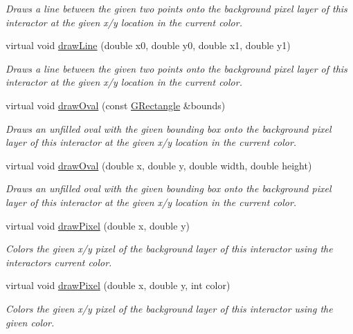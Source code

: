 \begin{DoxyCompactItemize}
\begin{DoxyCompactList}\small\item\em Draws a line between the given two points onto the background pixel layer of this interactor at the given x/y location in the current color. \end{DoxyCompactList}\item 
virtual void \mbox{\hyperlink{classsgl_1_1GDrawingSurface_aff299fe83178d2f3ce8c08c06b583484}{draw\+Line}} (double x0, double y0, double x1, double y1)
\begin{DoxyCompactList}\small\item\em Draws a line between the given two points onto the background pixel layer of this interactor at the given x/y location in the current color. \end{DoxyCompactList}\item 
virtual void \mbox{\hyperlink{classsgl_1_1GDrawingSurface_a8adc13027efe311b4a6a715205b8bc46}{draw\+Oval}} (const \mbox{\hyperlink{structsgl_1_1GRectangle}{G\+Rectangle}} \&bounds)
\begin{DoxyCompactList}\small\item\em Draws an unfilled oval with the given bounding box onto the background pixel layer of this interactor at the given x/y location in the current color. \end{DoxyCompactList}\item 
virtual void \mbox{\hyperlink{classsgl_1_1GDrawingSurface_aa5b1cf902e578907da3c63060686354e}{draw\+Oval}} (double x, double y, double width, double height)
\begin{DoxyCompactList}\small\item\em Draws an unfilled oval with the given bounding box onto the background pixel layer of this interactor at the given x/y location in the current color. \end{DoxyCompactList}\item 
virtual void \mbox{\hyperlink{classsgl_1_1GDrawingSurface_a0c1e2923d8d163d62d0896d8c5cfa191}{draw\+Pixel}} (double x, double y)
\begin{DoxyCompactList}\small\item\em Colors the given x/y pixel of the background layer of this interactor using the interactor\textquotesingle{}s current color. \end{DoxyCompactList}\item 
virtual void \mbox{\hyperlink{classsgl_1_1GDrawingSurface_a3a64eb6383e601be8438e9c71643c432}{draw\+Pixel}} (double x, double y, int color)
\begin{DoxyCompactList}\small\item\em Colors the given x/y pixel of the background layer of this interactor using the given color. \end{DoxyCompactList}\item 

\end{DoxyCompactItemize}

